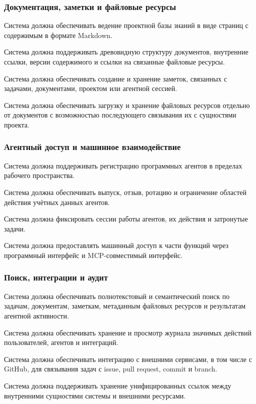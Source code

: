 \subsubsection{Документация, заметки и файловые ресурсы}

Система должна обеспечивать ведение проектной базы знаний в виде страниц с содержимым в формате Markdown.

Система должна поддерживать древовидную структуру документов, внутренние ссылки, версии содержимого и ссылки на связанные файловые ресурсы.

Система должна обеспечивать создание и хранение заметок, связанных с задачами, документами, проектом или агентной сессией.

Система должна обеспечивать загрузку и хранение файловых ресурсов отдельно от документов с возможностью последующего связывания их с сущностями проекта.

\subsubsection{Агентный доступ и машинное взаимодействие}

Система должна поддерживать регистрацию программных агентов в пределах рабочего пространства.

Система должна обеспечивать выпуск, отзыв, ротацию и ограничение областей действия учётных данных агентов.

Система должна фиксировать сессии работы агентов, их действия и затронутые задачи.

Система должна предоставлять машинный доступ к части функций через программный интерфейс и MCP-совместимый интерфейс.

\subsubsection{Поиск, интеграции и аудит}

Система должна обеспечивать полнотекстовый и семантический поиск по задачам, документам, заметкам, метаданным файловых ресурсов и результатам агентной активности.

Система должна обеспечивать хранение и просмотр журнала значимых действий пользователей, агентов и интеграций.

Система должна обеспечивать интеграцию с внешними сервисами, в том числе с GitHub, для связывания задач с issue, pull request, commit и branch.

Система должна поддерживать хранение унифицированных ссылок между внутренними сущностями системы и внешними ресурсами.

